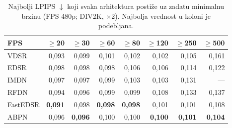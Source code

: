 \begin{table}[H]
    \centering
    \caption{Najbolji LPIPS $\downarrow$ koji svaka arhitektura postiže uz zadatu minimalnu brzinu (FPS 480p; DIV2K, $\times2$). Najbolja vrednost u koloni je podebljana.}
    \label{tab:fps_thr_LPIPS_single}
    \footnotesize
    \setlength{\tabcolsep}{3pt}
    \begin{tabular}{@{}lrrrrrrr@{}}
        \toprule
        FPS & $\geq$20 & $\geq$30 & $\geq$60 & $\geq$80 & $\geq$120 & $\geq$250 & $\geq$500 \\
        \midrule
        VDSR & 0,093 & 0,099 & 0,101 & 0,102 & 0,102 & 0,105 & 0,161 \\
        EDSR & 0,098 & 0,098 & 0,098 & 0,106 & 0,106 & 0,114 & 0,122 \\
        IMDN & 0,097 & 0,097 & 0,099 & 0,103 & 0,103 & 0,131 & --- \\
        RFDN & 0,094 & 0,096 & 0,099 & 0,099 & 0,108 & 0,133 & 0,137 \\
        FastEDSR & \textbf{0,091} & 0,098 & \textbf{0,098} & \textbf{0,098} & 0,101 & 0,101 & 0,108 \\
        ABPN & 0,096 & \textbf{0,096} & 0,100 & 0,100 & \textbf{0,100} & \textbf{0,101} & \textbf{0,104} \\
        \bottomrule
    \end{tabular}
\end{table}
